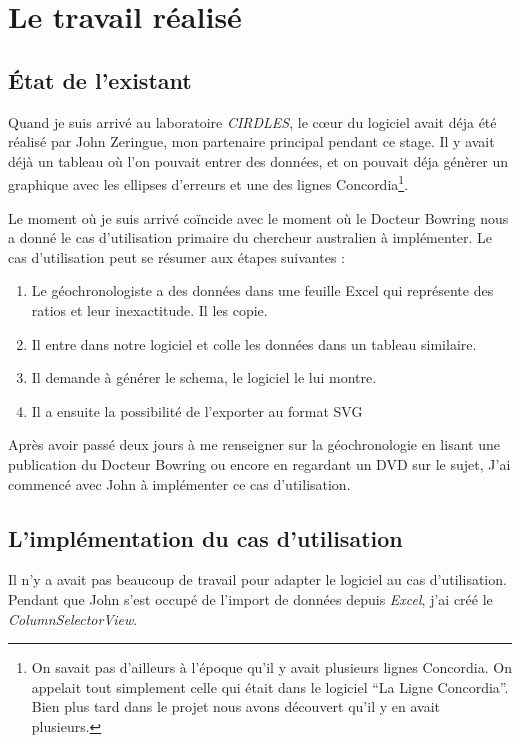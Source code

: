 ﻿\chapter{Le travail réalisé}

%
%
%
\section{État de l'existant}
Quand je suis arrivé au laboratoire \textit{CIRDLES}, le cœur du logiciel avait déja été réalisé par John Zeringue, mon partenaire principal pendant ce stage. Il y avait déjà un tableau où l'on pouvait entrer des données, et on pouvait déja génèrer un graphique avec les ellipses d'erreurs et une des lignes Concordia\footnote{On savait pas d'ailleurs à l'époque qu'il y avait plusieurs lignes Concordia. On appelait tout simplement celle qui était dans le logiciel ``La Ligne Concordia''. Bien plus tard dans le projet nous avons découvert qu'il y en avait plusieurs.}.

Le moment où je suis arrivé coïncide avec le moment où le Docteur Bowring nous a donné le cas d'utilisation primaire du chercheur australien à implémenter. Le cas d'utilisation peut se résumer aux étapes suivantes :
\begin{enumerate}
\item Le géochronologiste a des données dans une feuille Excel qui représente des ratios et leur inexactitude. Il les copie.
\item Il entre dans notre logiciel et colle les données dans un tableau similaire.
\item Il demande à générer le schema, le logiciel le lui montre.
\item Il a ensuite la possibilité de l'exporter au format SVG
\end{enumerate}

Après avoir passé deux jours à me renseigner sur la géochronologie en lisant une publication du Docteur Bowring ou encore en regardant un DVD sur le sujet, %
J'ai commencé avec John à implémenter ce cas d'utilisation.

%
%
%
\section{L'implémentation du cas d'utilisation}
Il n'y a avait pas beaucoup de travail pour adapter le logiciel au cas d'utilisation. Pendant que John s'est occupé de l'import de données depuis \textit{Excel}, j'ai créé le \textit{ColumnSelectorView}.


